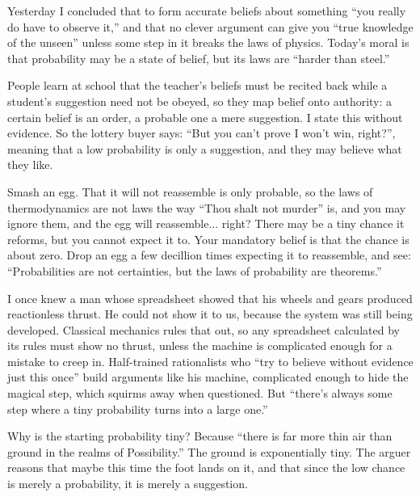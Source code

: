 
Yesterday I concluded that to form accurate beliefs about something ``you really do have to observe it,'' and that no clever argument can give you ``true knowledge of the unseen'' unless some step in it breaks the laws of physics.  Today's moral is that probability may be a state of belief, but its laws are ``harder than steel.''

People learn at school that the teacher's beliefs must be recited back while a student's suggestion need not be obeyed, so they map belief onto authority: a certain belief is an order, a probable one a mere suggestion. I state this without evidence. So the lottery buyer says: ``But you can't prove I won't win, right?'', meaning that a low probability is only a suggestion, and they may believe what they like.

Smash an egg. That it will not reassemble is only probable, so the laws of thermodynamics are not laws the way ``Thou shalt not murder'' is, and you may ignore them, and the egg will reassemble... right? There may be a tiny chance it reforms, but you cannot expect it to. Your mandatory belief is that the chance is about zero. Drop an egg a few decillion times expecting it to reassemble, and see: ``Probabilities are not certainties, but the laws of probability are theorems.''

I once knew a man whose spreadsheet showed that his wheels and gears produced reactionless thrust. He could not show it to us, because the system was still being developed. Classical mechanics rules that out, so any spreadsheet calculated by its rules must show no thrust, unless the machine is complicated enough for a mistake to creep in. Half-trained rationalists who ``try to believe without evidence just this once'' build arguments like his machine, complicated enough to hide the magical step, which squirms away when questioned. But ``there's always some step where a tiny probability turns into a large one.'' 

Why is the starting probability tiny? Because ``there is far more thin air than ground in the realms of Possibility.'' The ground is exponentially tiny. The arguer reasons that maybe this time the foot lands on it, and that since the low chance is merely a probability, it is merely a suggestion. 

